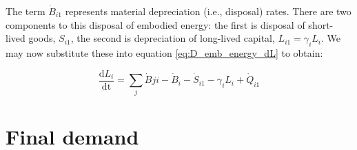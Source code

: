 The term $\dot{B}_{i1}$ represents material depreciation (i.e., disposal) rates. There are two components to this disposal of embodied energy: the first is disposal of short-lived goods, $S_{i1}$, the second is depreciation of long-lived capital, $L_{i1} = \gamma_i L_i$. We may now substitute these into equation \ref{eq:D_emb_energy_dL} to obtain:

\begin{equation}\label{eq:D_dep}
\frac{\textrm{d}L_{i}}{\textrm{dt}} = \sum_{j}\dot{B}{ji} - \dot{B}_{i} - \dot{S}_{i1} - \gamma_i L_i + \dot{Q}_{i1}
\end{equation}

%
%
%
%


\section{Final demand}

